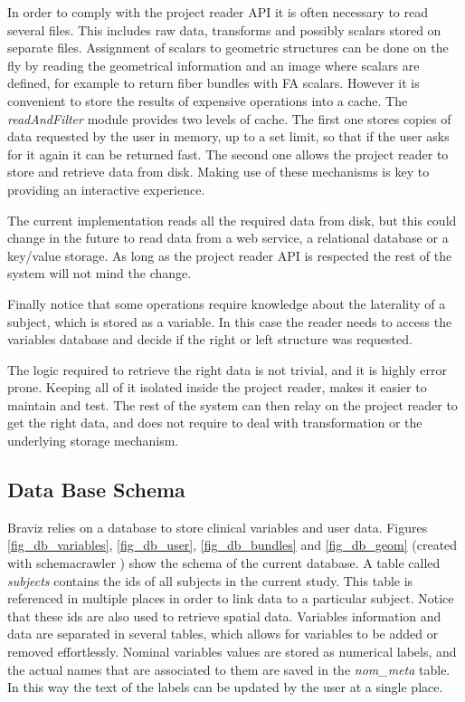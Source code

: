 In order to comply with the project reader API it is often necessary to read several files. This includes raw data, transforms and possibly scalars stored on separate files. Assignment of scalars to geometric structures can be done on the fly by reading the geometrical information and an image where scalars are defined, for example to return fiber bundles with FA scalars. However it is convenient to store the results of expensive operations into a cache. The \emph{readAndFilter} module provides two levels of cache. The first one stores copies of data requested by the user in memory, up to a set limit, so that if the user asks for it again it can be returned fast. The second one allows the project reader to store and retrieve data from disk. Making use of these mechanisms is key to providing an interactive experience. 

The current implementation reads all the required data from disk, but this could change in the future to read data from a web service, a relational database or a key/value storage. As long as the project reader API is respected the rest of the system will not mind the change.

Finally notice that some operations require knowledge about the laterality of a subject, which is stored as a variable. In this case the reader needs to access the variables database and decide if the right or left structure was requested. 

The logic required to retrieve the right data is not trivial, and it is highly error prone. Keeping all of it isolated inside the project reader, makes it easier to maintain and test. The rest of the system can then relay on the project reader to get the right data, and does not require to deal with transformation or the underlying storage mechanism. 


\subsection{Data Base Schema}

Braviz relies on a database to store clinical variables and user data. Figures \ref{fig_db_variables}, \ref{fig_db_user}, \ref{fig_db_bundles} and \ref{fig_db_geom} (created with schemacrawler \autocite{_schemacrawler_????}) show the schema of the current database. 
A table called \emph{subjects} contains the ids of all subjects in the current study. This table is referenced in multiple places in order to link data to a particular subject. Notice that these ids are also used to retrieve spatial data.
Variables information and data are separated in several tables, which allows for variables to be added or removed effortlessly. Nominal variables values are stored as numerical labels, and the actual names that are associated to them are saved in the \emph{nom\_meta} table. In this way the text of the labels can be updated by the user at a single place. 

